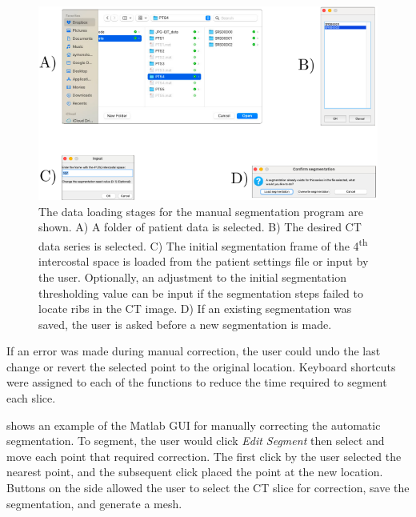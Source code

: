 \begin{figure}[H]
	\centering
	\includegraphics[width=\textwidth]{chapter5-CT_to_mesh/imgs/SegmentationAppSetup.pdf}
	\caption[Manual segmentation data loading]{\label{fig:seg_load}%
	The data loading stages for the manual segmentation program are shown.
	A) A folder of patient data is selected. B) The desired CT data series is selected.
	C) The initial segmentation frame of the 4\textsuperscript{th} intercostal space 
	is loaded from the patient settings file or input by the user. Optionally, an 
	adjustment to the initial segmentation thresholding value can be input if the 
	segmentation steps failed to locate ribs in the CT image. D) If an existing
	segmentation was saved, the user is asked before a new segmentation 
	is made.
	}
\end{figure}

If an error was made during manual correction, the user could undo
the last change or revert the selected point to the original location. 
Keyboard shortcuts were assigned to each of the functions to reduce the time required
to segment each slice.

 shows an example of the Matlab GUI for manually correcting
the automatic segmentation. To segment, the user would click \emph{Edit Segment} 
then select and move each point that required correction. The first click by the user
selected the nearest point, and the subsequent click placed the point at the new location. 
Buttons on the side allowed the user to 
select the CT slice for correction, save the segmentation, and generate a mesh. 

